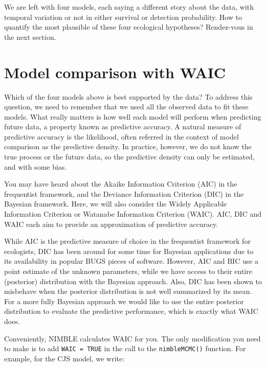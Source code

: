 \documentclass[
  12pt,
]{krantz}
\begin{document}
We are left with four models, each saying a different story about the data, with temporal variation or not in either survival or detection probability. How to quantify the most plausible of these four ecological hypotheses? Rendez-vous in the next section.

\section{Model comparison with WAIC}\label{waic}

Which of the four models above is best supported by the data? To address this question, we need to remember that we used all the observed data to fit these models. What really matters is how well each model will perform when predicting future data, a property known as predictive accuracy. A natural measure of predictive accuracy is the likelihood, often referred in the context of model comparison as the predictive density. In practice, however, we do not know the true process or the future data, so the predictive density can only be estimated, and with some bias.

You may have heard about the Akaike Information Criterion (AIC) in the frequentist framework, and the Deviance Information Criterion (DIC) in the Bayesian framework. Here, we will also consider the Widely Applicable Information Criterion or Watanabe Information Criterion (WAIC). AIC, DIC and WAIC each aim to provide an approximation of predictive accuracy.

While AIC is the predictive measure of choice in the frequentist framework for ecologists, DIC has been around for some time for Bayesian applications due to its availability in popular BUGS pieces of software. However, AIC and BIC use a point estimate of the unknown parameters, while we have access to their entire (posterior) distribution with the Bayesian approach. Also, DIC has been shown to misbehave when the posterior distribution is not well summarized by its mean. For a more fully Bayesian approach we would like to use the entire posterior distribution to evaluate the predictive performance, which is exactly what WAIC does.

Conveniently, NIMBLE calculates WAIC for you. The only modification you need to make is to add \texttt{WAIC\ =\ TRUE} in the call to the \texttt{nimbleMCMC()} function. For example, for the CJS model, we write:
\end{document}

